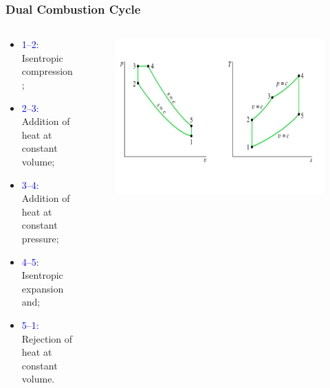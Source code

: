 \documentclass[10pt,compress]{beamer}
\begin{document}
\begin{frame}
 \frametitle{Dual Combustion Cycle}
  \begin{columns}
   \begin{column}[c]{0.45\linewidth}
    \begin{itemize}
     \item <1-> \textcolor{blue}{1--2:} Isentropic compression;
     \item <2-> \textcolor{blue}{2--3:} Addition of heat at constant volume;
     \item <3-> \textcolor{blue}{3--4:} Addition of heat at constant pressure;
     \item <4-> \textcolor{blue}{4--5:} Isentropic expansion and;
     \item <5-> \textcolor{blue}{5--1:} Rejection of heat at constant volume.
    \end{itemize}
   \end{column}
   \begin{column}[c]{0.55\linewidth}
    \begin{figure}%
     \begin{center}
      \includegraphics[width=6.cm,clip]{./Pics/InternalCombustion_IdealDualCombustion}
     \end{center}
    \end{figure}   
   \end{column}  
  \end{columns}
\end{frame}
\end{document}
